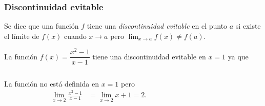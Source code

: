 	
	\begin{frame}
		\frametitle{Discontinuidad evitable}
		\begin{definicion}
			Se dice que una función $f$ tiene una \emph{discontinuidad evitable} en el punto $a$ si
			existe el límite de $f(x)$ cuando $x\rightarrow a$ pero $\displaystyle \lim_{x\rightarrow a}f(x)\neq f(a)$.
		\end{definicion}
		
		 La función $f(x)=\dfrac{x^2-1}{x-1}$ tiene una discontinuidad evitable en $x=1$ ya que
		\begin{columns}
			\begin{column}{0.4\textwidth}
				La función no está definida en $x=1$ pero
				\begin{align*}
					\lim_{x\rightarrow 2}\frac{x^2-1}{x-1} & = \lim_{x\rightarrow 2}x+1=2. 
				\end{align*}
			\end{column}
			\begin{column}{0.5\textwidth}
				\begin{center}
					\scalebox{1}{}
				\end{center}
			\end{column}
		\end{columns}
		
		
	\end{frame}
	
